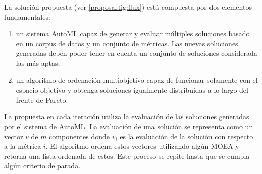 La soluci\'on propuesta (ver \ref{proposal:fig:flux}) est\'a compuesta por dos elementos fundamentales:
\begin{enumerate}
    \item un sistema AutoML capaz de generar y evaluar m\'ultiples soluciones basado en un corpus de datos y un conjunto de m\'etricas. Las nuevas soluciones generadas deben poder tener en cuenta un conjunto de soluciones considerada las m\'as aptas; %
    \item un algoritmo de ordenaci\'on multiobjetivo capaz de funcionar solamente con el espacio objetivo y obtenga soluciones igualmente distribuidas a lo largo del frente de Pareto.
\end{enumerate}

La propuesta en cada iteraci\'on utiliza la evaluaci\'on de las soluciones generadas por el sistema de AutoML. La evaluaci\'on de una soluci\'on se representa como un vector $v$ de $m$ componentes donde $v_i$ es la evaluaci\'on de la soluci\'on con respecto a la m\'etrica $i$. El algoritmo ordena estos vectores utilizando alg\'un MOEA y retorna una lista ordenada de estos. Este proceso se repite hasta que se cumpla alg\'un criterio de parada.


